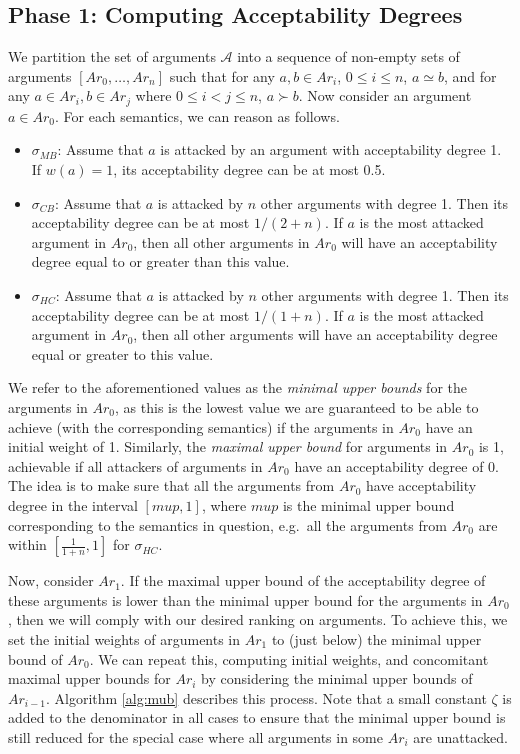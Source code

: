 \documentclass{article}
\newcommand{\A}{\mathcal{A}}
\begin{document}
\subsection{Phase 1: Computing Acceptability Degrees}
\label{sec:phase1}
We partition the set of arguments $\A$ into a sequence of non-empty sets of arguments $[Ar_0, \ldots, Ar_n]$ such that for any $a,b \in Ar_i$, $0 \leq i \leq n$, $a \simeq b$, and for any $a \in Ar_i, b \in Ar_j$ where $0 \leq i < j \leq n$, $a \succ b$.
%
Now consider an argument $a \in Ar_0$. For each semantics, we can reason as follows.
\begin{itemize}
    \item $\sigma_{MB}$: Assume that $a$  is attacked by an argument with acceptability degree 1. If $w(a) =1$, its acceptability degree can be at most 0.5.
    \item $\sigma_{CB}$: Assume that $a$ is attacked by $n$ other arguments with degree 1. Then its acceptability degree can be at most $1/(2+n)$. If $a$ is the most attacked argument in $Ar_0$, then all other arguments in $Ar_0$ will have an acceptability degree equal to or greater than this value.
    
    \item $\sigma_{HC}$: Assume that $a$ is attacked by $n$ other arguments with degree 1. Then its acceptability degree can be at most $1/(1+n)$. If $a$ is the most attacked argument in $Ar_0$, then all other arguments will have an acceptability degree equal or greater to this value.
\end{itemize}

We refer to the aforementioned values as the \emph{minimal upper bounds} for the arguments in $Ar_0$, as this is the lowest value we are guaranteed to be able to achieve (with the corresponding semantics) if the arguments in $Ar_0$ have an initial weight of 1.
%
Similarly, the \emph{maximal upper bound} for arguments in $Ar_0$ is 1, achievable if all attackers of arguments in $Ar_0$ have an acceptability degree of 0.
%
The idea is to make sure that all the arguments from $Ar_0$ have acceptability degree in the interval $[mup, 1]$, where $mup$ is the minimal upper bound corresponding to the semantics in question, e.g.\ all the arguments from $Ar_0$ are within $[\frac{1}{1+n}, 1]$ for $\sigma_{HC}$.

Now, consider $Ar_1$. If the maximal upper bound of the acceptability degree of these arguments is lower than the minimal upper bound for the arguments in $Ar_0$, then we will comply with our desired ranking on arguments. To achieve this, we set the initial weights of arguments in $Ar_1$ to (just below) the minimal upper bound of $Ar_0$. We can repeat this, computing initial weights, and concomitant maximal upper bounds for $Ar_i$ by considering the minimal upper bounds of $Ar_{i-1}$. Algorithm \ref{alg:mub} describes this process. Note that a small constant $\zeta$ is added to the denominator in all cases to ensure that the minimal upper bound is still reduced for the special case where all arguments in some $Ar_i$ are unattacked.
\end{document}
